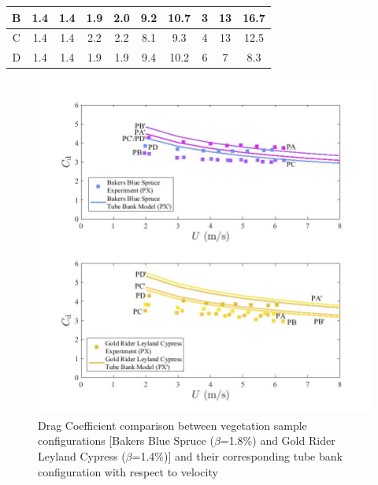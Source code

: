 \documentclass[12pt]{article}
\begin{document}
\begin{table}[!]
\begin{tabular}{|c|c|c|c|c|c|c|c|c|c|}
    B                            & 1.4          & 1.4      & 1.9                  & 2.0               & 9.2               & 10.7        & 3                           & 13            &   16.7                 \\ \hline
    C                            & 1.4           & 1.4     & 2.2                  & 2.2                & 8.1               & 9.3       & 4                          & 13               &   12.5       \\ \hline
    D                            & 1.4            & 1.4      & 1.9                  & 1.9                & 9.4               & 10.2       & 6                          & 7              &   8.3             \\ \hline
    \end{tabular}
\end{table}

\begin{figure}[!]
	\centering 	
\includegraphics[width=\textwidth,keepaspectratio]{Picture13.jpg}
	\caption[Drag Coefficient comparison between vegetation samples and tube bank configurations]{Drag Coefficient comparison between vegetation sample configurations [Bakers Blue Spruce ($\beta$=1.8\%) and Gold Rider Leyland Cypress ($\beta$=1.4\%)] and their corresponding tube bank configuration with respect to velocity}
	\label{fig:TBGR}
\end{figure}
\end{document}

